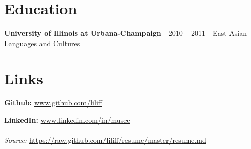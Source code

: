 \documentclass{article}
\begin{document}
\section{Education}

\textbf{University of Illinois at Urbana-Champaign} - 2010 -- 2011 - East Asian Languages and Cultures
\section{Links}

\textbf{Github:} \url{www.github.com/liliff}\par
\textbf{LinkedIn:} \url{www.linkedin.com/in/musee}
\\
\\
\textsl{Source:} \url{https://raw.github.com/liliff/resume/master/resume.md}
\end{document}
